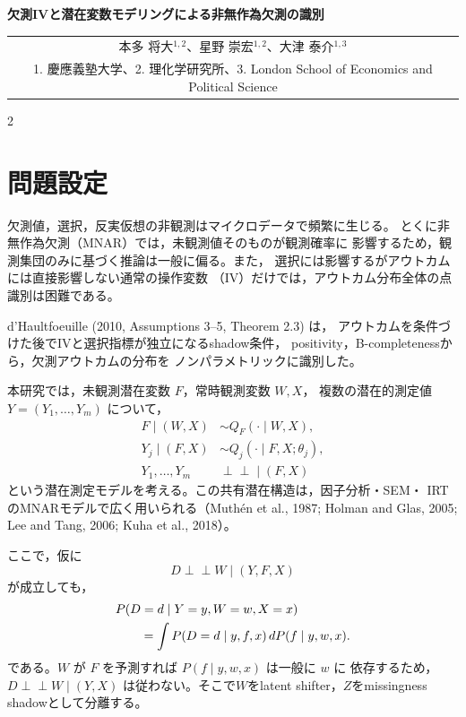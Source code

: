 \documentclass[a4paper,10pt]{article}
\newcommand{\indep}{\mathrel{\perp\!\!\!\perp}}
\newcommand{\papertitle}{欠測IVと潜在変数モデリングによる非無作為欠測の識別}
\newcommand{\authorblock}{%
  \begin{tabular}{c}
    本多 将大\(^{1,2}\)、星野 崇宏\(^{1,2}\)、大津 泰介\(^{1,3}\)\\[-0.1mm]
    {\scriptsize 1. 慶應義塾大学、2. 理化学研究所、3. London School of Economics and Political Science}
  \end{tabular}
}
\begin{document}
\vspace*{-9mm}
\begin{center}
  {\large\bfseries \papertitle\par}
  \vspace{0.7mm}
  {\footnotesize \authorblock}
\end{center}
\vspace{-3.5mm}

\footnotesize
\setlength{\baselineskip}{9.7pt}
\setlength{\abovedisplayskip}{1.2pt}
\setlength{\belowdisplayskip}{1.2pt}
\setlength{\abovedisplayshortskip}{0.8pt}
\setlength{\belowdisplayshortskip}{0.8pt}
\setlength{\jot}{0pt}
\begin{multicols}{2}

\section{問題設定}
欠測値，選択，反実仮想の非観測はマイクロデータで頻繁に生じる。
とくに非無作為欠測（MNAR）では，未観測値そのものが観測確率に
影響するため，観測集団のみに基づく推論は一般に偏る。また，
選択には影響するがアウトカムには直接影響しない通常の操作変数
（IV）だけでは，アウトカム分布全体の点識別は困難である。

d'Haultfoeuille (2010, Assumptions 3--5, Theorem 2.3) は，
アウトカムを条件づけた後でIVと選択指標が独立になるshadow条件，
positivity，B-completenessから，欠測アウトカムの分布を
ノンパラメトリックに識別した。

本研究では，未観測潜在変数 $F$，常時観測変数 $W,X$，
複数の潜在的測定値 $Y=(Y_1,\ldots,Y_m)$ について，
\begin{align}
F\mid(W,X)&\sim Q_F(\cdot\mid W,X),\\
Y_j\mid(F,X)&\sim Q_j(\cdot\mid F,X;\theta_j),\\
Y_1,\ldots,Y_m&\indep\mid(F,X)
\end{align}
という潜在測定モデルを考える。この共有潜在構造は，因子分析・SEM・
IRTのMNARモデルで広く用いられる（Muth\'en et al., 1987;
Holman and Glas, 2005; Lee and Tang, 2006; Kuha et al., 2018）。

ここで，仮に
\[
D\indep W\mid(Y,F,X)
\]
が成立しても，
\begin{align}
&P(D=d\mid Y=y,W=w,X=x) \notag\\
&\qquad=
\int P(D=d\mid y,f,x)\,dP(f\mid y,w,x).
\end{align}
である。$W$ が $F$ を予測すれば $P(f\mid y,w,x)$ は一般に $w$ に
依存するため，$D\indep W\mid(Y,X)$ は従わない。そこで$W$をlatent
shifter，$Z$をmissingness shadowとして分離する。


\end{multicols}
\end{document}
